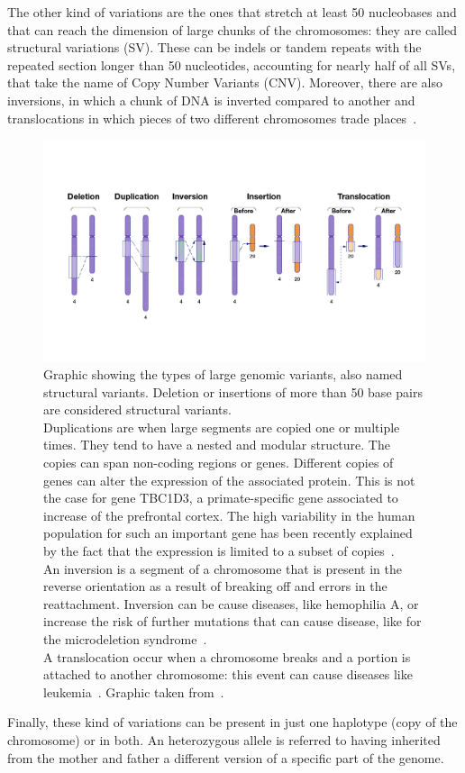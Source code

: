 The other kind of variations are the ones that stretch at least 50 nucleobases and that can reach the dimension of large chunks of the chromosomes: they are called structural variations (\gls{SV}).
These can be indels or tandem repeats with the repeated section longer than 50 nucleotides, accounting for nearly half of all SVs, that take the name of Copy Number Variants (\gls{CNV}). Moreover, there are also inversions, in which a chunk of DNA is inverted compared to another and translocations in which pieces of two different chromosomes trade places~\cite{nih_variation}.\\
\begin{figure}[!ht]
	\centering
	\includegraphics[width=\linewidth]{figures/background/large_variants.png}
	\caption[Large genomic variants.]{Graphic showing the types of large genomic variants, also named structural variants. Deletion or insertions of more than 50 base pairs are considered structural variants.\\ Duplications are when large segments are copied one or multiple times. They tend to have a nested and modular structure. The copies can span non-coding regions or genes. Different copies of genes can alter the expression of the associated protein. This is not the case for gene TBC1D3, a primate-specific gene associated to increase of the prefrontal cortex. The high variability in the human population for such an important gene has been recently explained by the fact that the expression is limited to a subset of copies~\cite{tbc1d3}.\\  An inversion is a segment of a chromosome that is present in the reverse orientation as a result of breaking off and errors in the reattachment. Inversion can be cause diseases, like hemophilia A, or increase the risk of further mutations that can cause disease, like for the microdeletion syndrome~\cite{inversions_disease}.\\ A translocation occur when a chromosome breaks and a portion is attached to another chromosome: this event can cause diseases like leukemia~\cite{leukemia}.  Graphic taken from~\cite{nih_variation}. }
	\label{fig:large_variants}
\end{figure}
Finally, these kind of variations can be present in just one haplotype (copy of the chromosome) or in both. An heterozygous allele is referred to having inherited from the mother and father a different version of a specific part of the genome.

